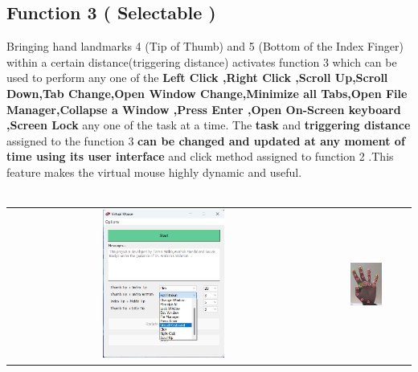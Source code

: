 \documentclass[12pt,a4paper]{report}
\begin{document}
		\subsection{Function 3 ( Selectable )}	Bringing hand landmarks 4 (Tip of Thumb) and 5 (Bottom of the Index Finger) within a certain distance(triggering distance) activates function 3 which can be used to perform any one of the \textbf{Left Click ,Right Click ,Scroll Up,Scroll Down,Tab Change,Open Window Change,Minimize all Tabs,Open File Manager,Collapse a Window ,Press Enter ,Open On-Screen keyboard ,Screen Lock} any one of the task at a time. The \textbf{task} and \textbf{triggering distance} assigned to the function 3 \textbf{can be changed and updated at any moment of time using its user interface} and click method assigned to function 2 .This feature makes the virtual mouse highly dynamic and useful.
	\\ \\
		    \begin{tabular}{c c}
 \includegraphics[width=0.4\textwidth]{action3f}&
 \includegraphics[width=0.4\textwidth]{action3} 
    \end{tabular}
    		\label{Function 4 ( Selectable )}
\end{document}
